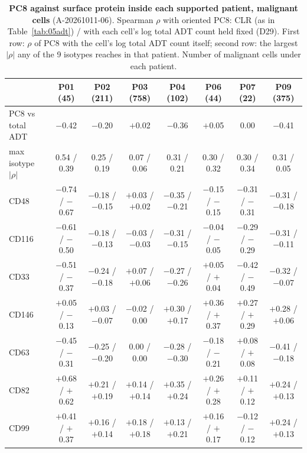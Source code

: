 \begin{table}[H]
\centering
\caption{\textbf{PC8 against surface protein inside each supported patient, malignant cells} (A-20261011-06). Spearman $\rho$ with oriented PC8: CLR (as in Table~\ref{tab:05adt}) / with each cell's log total ADT count held fixed (D29). First row: $\rho$ of PC8 with the cell's log total ADT count itself; second row: the largest $|\rho|$ any of the 9 isotypes reaches in that patient. Number of malignant cells under each patient.}
\label{tab:05p03}
\scriptsize
\setlength{\tabcolsep}{1.7pt}
\begin{tabular}{@{}lccccccc@{}}
\toprule
 & P01 (45) & P02 (211) & P03 (758) & P04 (102) & P06 (44) & P07 (22) & P09 (375) \\
\midrule
 PC8 vs total ADT & $-$0.42 & $-$0.20 & $+$0.02 & $-$0.36 & $+$0.05 & 0.00 & $-$0.41 \\
 max isotype $|\rho|$ & 0.54 / 0.39 & 0.25 / 0.19 & 0.07 / 0.06 & 0.31 / 0.21 & 0.30 / 0.32 & 0.30 / 0.34 & 0.31 / 0.05 \\
\midrule
 CD48 & $-$0.74 / $-$0.67 & $-$0.18 / $-$0.15 & $+$0.03 / $+$0.02 & $-$0.35 / $-$0.21 & $-$0.15 / $-$0.15 & $-$0.31 / $-$0.31 & $-$0.31 / $-$0.18 \\
 CD116 & $-$0.61 / $-$0.50 & $-$0.18 / $-$0.13 & $-$0.03 / $-$0.03 & $-$0.31 / $-$0.15 & $-$0.04 / $-$0.05 & $-$0.29 / $-$0.29 & $-$0.31 / $-$0.11 \\
 CD33 & $-$0.51 / $-$0.37 & $-$0.24 / $-$0.18 & $+$0.07 / $+$0.06 & $-$0.27 / $-$0.26 & $+$0.05 / $+$0.04 & $-$0.42 / $-$0.49 & $-$0.32 / $-$0.07 \\
 CD146 & $+$0.05 / $-$0.13 & $+$0.03 / $-$0.07 & $-$0.02 / 0.00 & $+$0.30 / $+$0.17 & $+$0.36 / $+$0.37 & $+$0.27 / $+$0.29 & $+$0.28 / $+$0.06 \\
 CD63 & $-$0.45 / $-$0.31 & $-$0.25 / $-$0.20 & 0.00 / 0.00 & $-$0.28 / $-$0.30 & $-$0.18 / $-$0.21 & $+$0.08 / $+$0.08 & $-$0.41 / $-$0.18 \\
 CD82 & $+$0.68 / $+$0.62 & $+$0.21 / $+$0.19 & $+$0.14 / $+$0.14 & $+$0.35 / $+$0.24 & $+$0.26 / $+$0.28 & $+$0.11 / $+$0.12 & $+$0.24 / $+$0.13 \\
 CD99 & $+$0.41 / $+$0.37 & $+$0.16 / $+$0.14 & $+$0.18 / $+$0.18 & $+$0.13 / $+$0.21 & $+$0.16 / $+$0.17 & $-$0.12 / $-$0.12 & $+$0.24 / $+$0.13 \\
\bottomrule
\end{tabular}
\end{table}

